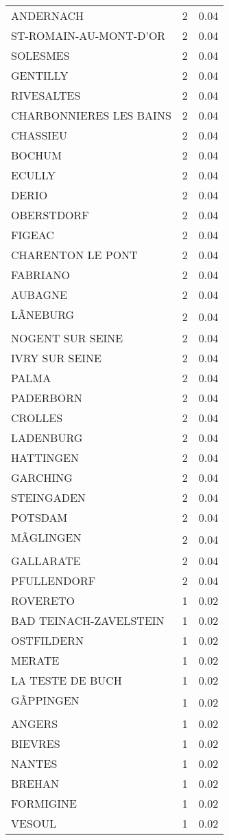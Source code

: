 \begin{table*}[htbp]
\begin{tabular}{lrr}
ANDERNACH & 2 & 0.04 \\
ST-ROMAIN-AU-MONT-D'OR & 2 & 0.04 \\
SOLESMES & 2 & 0.04 \\
GENTILLY & 2 & 0.04 \\
RIVESALTES & 2 & 0.04 \\
CHARBONNIERES LES BAINS & 2 & 0.04 \\
CHASSIEU & 2 & 0.04 \\
BOCHUM & 2 & 0.04 \\
ECULLY & 2 & 0.04 \\
DERIO & 2 & 0.04 \\
OBERSTDORF & 2 & 0.04 \\
FIGEAC & 2 & 0.04 \\
CHARENTON LE PONT & 2 & 0.04 \\
FABRIANO & 2 & 0.04 \\
AUBAGNE & 2 & 0.04 \\
LÃNEBURG & 2 & 0.04 \\
NOGENT SUR SEINE & 2 & 0.04 \\
IVRY SUR SEINE & 2 & 0.04 \\
PALMA & 2 & 0.04 \\
PADERBORN & 2 & 0.04 \\
CROLLES & 2 & 0.04 \\
LADENBURG & 2 & 0.04 \\
HATTINGEN & 2 & 0.04 \\
GARCHING & 2 & 0.04 \\
STEINGADEN & 2 & 0.04 \\
POTSDAM & 2 & 0.04 \\
MÃGLINGEN & 2 & 0.04 \\
GALLARATE & 2 & 0.04 \\
PFULLENDORF & 2 & 0.04 \\
ROVERETO & 1 & 0.02 \\
BAD TEINACH-ZAVELSTEIN & 1 & 0.02 \\
OSTFILDERN & 1 & 0.02 \\
MERATE & 1 & 0.02 \\
LA TESTE DE BUCH & 1 & 0.02 \\
GÃPPINGEN & 1 & 0.02 \\
ANGERS & 1 & 0.02 \\
BIEVRES & 1 & 0.02 \\
NANTES & 1 & 0.02 \\
BREHAN & 1 & 0.02 \\
FORMIGINE & 1 & 0.02 \\
VESOUL & 1 & 0.02 \\

\end{tabular}
\end{table*}
